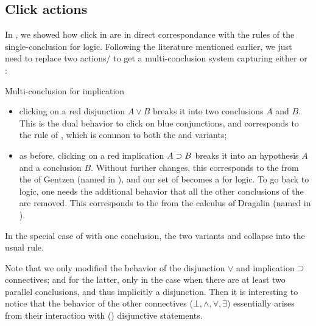 \begin{scope}
\section{Click actions}

In , we showed how click  in  are in direct
correspondance with the rules of the single-conclusion  
for  logic. Following the literature mentioned earlier, we just
need to replace two actions/ to get a multi-conclusion system
capturing either  or  :

\begin{marginfigure}
  \caption{Multi-conclusion  for implication}
\end{marginfigure}

\begin{itemize}
  \item clicking on a red disjunction $A \lor B$ breaks it into two conclusions
  $A$ and $B$. This is the dual behavior to click  on blue conjunctions,
  and corresponds to the {} rule of , which is
  common to both the  and  variants;
  \item as before, clicking on a red implication $A \supset B$ breaks it into an
  hypothesis $A$ and a conclusion $B$. Without further changes, this corresponds
  to the  from the    of Gentzen (named {} in
  ), and our set of  becomes a 
  for  logic. To go back to  logic, one needs
  the additional behavior that all the other conclusions of the  are
  removed. This corresponds to the  from the
   calculus of Dragalin (named {} in
  ).
\end{itemize}

\begin{remark}
  In the special case of   with one conclusion, the two
  variants {} and {} collapse into the usual
  {} rule.
\end{remark}
Note that we only modified the behavior of the disjunction $\lor$ and
implication $\supset$ connectives; and for the latter, only in the case when there
are at least two parallel conclusions, and thus implicitly a disjunction. Then
it is interesting to notice that the  behavior of the other connectives
($\bot, \land, \forall, \exists$) essentially arises from their interaction with
() disjunctive statements.


\end{scope}
